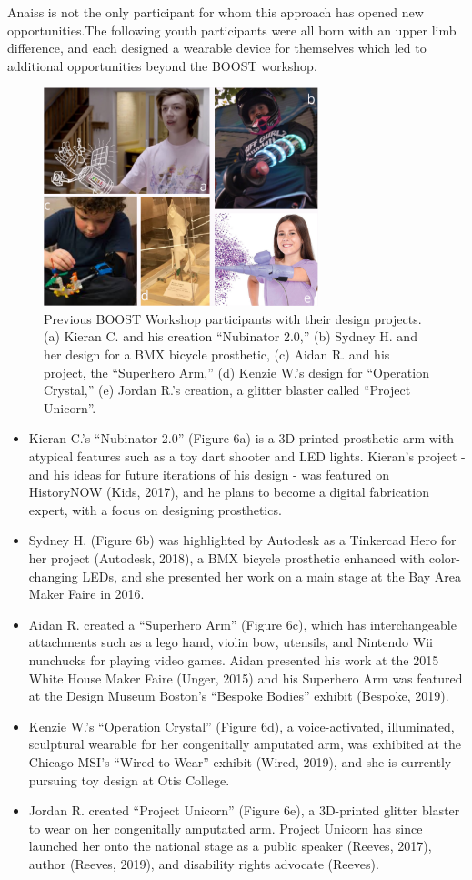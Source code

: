 \documentclass[11.5pt]{sig-alternate} %
\begin{document}
\begin{large}
Anaiss is not the only participant for whom this approach has opened new opportunities.The following youth participants were all born with an upper limb difference, and each designed a wearable device for themselves which led to additional opportunities beyond the BOOST workshop.
\begin{figure}[h]
    \centering
    \includegraphics[width=8cm]{figure6.png}
    \caption{Previous BOOST Workshop participants with their design projects. (a)
Kieran C. and his creation “Nubinator 2.0,” (b) Sydney H. and her design for a BMX
bicycle prosthetic, (c) Aidan R. and his project, the “Superhero Arm,” (d) Kenzie W.’s
design for “Operation Crystal,” (e) Jordan R.’s creation, a glitter blaster called “Project
Unicorn”. }
\end{figure}
\begin{itemize}
    \item 	Kieran C.’s “Nubinator 2.0” (Figure 6a) is a 3D printed prosthetic arm with
atypical features such as a toy dart shooter and LED lights. Kieran’s
project - and his ideas for future iterations of his design - was featured on HistoryNOW (Kids, 2017), and he plans to become a digital fabrication
expert, with a focus on designing prosthetics.
\item 	Sydney H. (Figure 6b) was highlighted by Autodesk as a Tinkercad Hero
for her project (Autodesk, 2018), a BMX bicycle prosthetic enhanced with
color-changing LEDs, and she presented her work on a main stage at the
Bay Area Maker Faire in 2016.
\item 	Aidan R. created a “Superhero Arm” (Figure 6c), which has
interchangeable attachments such as a lego hand, violin bow, utensils,
and Nintendo Wii nunchucks for playing video games. Aidan presented his
work at the 2015 White House Maker Faire (Unger, 2015) and his
Superhero Arm was featured at the Design Museum Boston’s “Bespoke
Bodies” exhibit (Bespoke, 2019).
\item Kenzie W.’s “Operation Crystal” (Figure 6d), a voice-activated, illuminated,
sculptural wearable for her congenitally amputated arm, was exhibited at
the Chicago MSI’s “Wired to Wear” exhibit (Wired, 2019), and she is
currently pursuing toy design at Otis College. 
\item 	Jordan R. created “Project Unicorn” (Figure 6e), a 3D-printed glitter blaster
to wear on her congenitally amputated arm. Project Unicorn has since
launched her onto the national stage as a public speaker (Reeves, 2017),
author (Reeves, 2019), and disability rights advocate (Reeves).
\end{itemize}


\end{large}
\end{document}
